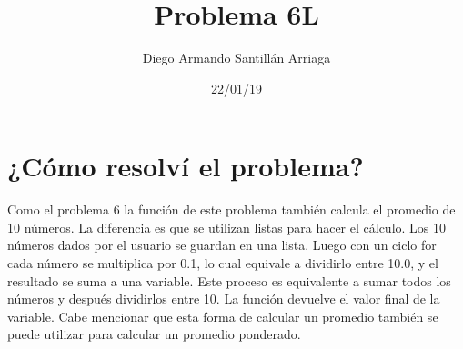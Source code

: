 \documentclass[letterpaper, 12pt, oneside]{article}%
\title{\Huge Problema 6L}
\author{Diego Armando Santillán Arriaga}
\date{22/01/19}
\begin{document}
\maketitle
\newpage
\section*{¿Cómo resolví el problema?}
Como el problema 6 la función de este problema también calcula el promedio de 10 números. La diferencia es que se utilizan listas para hacer el cálculo.
Los 10 números dados por el usuario se guardan en una lista. Luego con un ciclo for cada número se multiplica por 0.1, lo cual equivale a dividirlo entre 10.0, y el resultado se suma a una variable. Este proceso es equivalente a sumar todos los números y después dividirlos entre 10. La función devuelve el valor final de la variable. Cabe mencionar que esta forma de calcular un promedio también se puede utilizar para calcular un promedio ponderado. 
\end{document}
